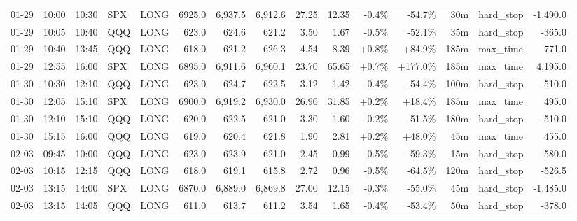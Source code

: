 \documentclass[11pt,a4paper,twoside]{article}
\begin{document}
\begin{landscape}
\begin{center}
\begin{longtable}{>{\color{txtmain}}l l l l l r r r r r r r r >{\color{txtmain}}l r}
01-29 & 10:00 & 10:30 & SPX & LONG & 6925.0 & 6,937.5 & 6,912.6 & 27.25 & 12.35 & \textcolor{lossred}{-0.4\%} & \textcolor{lossred}{-54.7\%} & 30m & hard\_stop & \textcolor{lossred}{-1,490.0} \\
01-29 & 10:05 & 10:40 & QQQ & LONG & 623.0 & 624.6 & 621.2 & 3.50 & 1.67 & \textcolor{lossred}{-0.5\%} & \textcolor{lossred}{-52.1\%} & 35m & hard\_stop & \textcolor{lossred}{-365.0} \\
01-29 & 10:40 & 13:45 & QQQ & LONG & 618.0 & 621.2 & 626.3 & 4.54 & 8.39 & \textcolor{wingreen}{+0.8\%} & \textcolor{wingreen}{+84.9\%} & 185m & max\_time & \textcolor{wingreen}{771.0} \\
01-29 & 12:55 & 16:00 & SPX & LONG & 6895.0 & 6,911.6 & 6,960.1 & 23.70 & 65.65 & \textcolor{wingreen}{+0.7\%} & \textcolor{wingreen}{+177.0\%} & 185m & max\_time & \textcolor{wingreen}{4,195.0} \\
01-30 & 10:30 & 12:10 & QQQ & LONG & 623.0 & 624.7 & 622.5 & 3.12 & 1.42 & \textcolor{lossred}{-0.4\%} & \textcolor{lossred}{-54.4\%} & 100m & hard\_stop & \textcolor{lossred}{-510.0} \\
01-30 & 12:05 & 15:10 & SPX & LONG & 6900.0 & 6,919.2 & 6,930.0 & 26.90 & 31.85 & \textcolor{wingreen}{+0.2\%} & \textcolor{wingreen}{+18.4\%} & 185m & max\_time & \textcolor{wingreen}{495.0} \\
01-30 & 12:10 & 15:10 & QQQ & LONG & 620.0 & 622.5 & 621.0 & 3.30 & 1.60 & \textcolor{lossred}{-0.2\%} & \textcolor{lossred}{-51.5\%} & 180m & hard\_stop & \textcolor{lossred}{-510.0} \\
01-30 & 15:15 & 16:00 & QQQ & LONG & 619.0 & 620.4 & 621.8 & 1.90 & 2.81 & \textcolor{wingreen}{+0.2\%} & \textcolor{wingreen}{+48.0\%} & 45m & max\_time & \textcolor{wingreen}{455.0} \\
02-03 & 09:45 & 10:00 & QQQ & LONG & 623.0 & 623.9 & 621.0 & 2.45 & 0.99 & \textcolor{lossred}{-0.5\%} & \textcolor{lossred}{-59.3\%} & 15m & hard\_stop & \textcolor{lossred}{-580.0} \\
02-03 & 10:15 & 12:15 & QQQ & LONG & 618.0 & 619.1 & 615.8 & 2.72 & 0.96 & \textcolor{lossred}{-0.5\%} & \textcolor{lossred}{-64.5\%} & 120m & hard\_stop & \textcolor{lossred}{-526.5} \\
02-03 & 13:15 & 14:00 & SPX & LONG & 6870.0 & 6,889.0 & 6,869.8 & 27.00 & 12.15 & \textcolor{lossred}{-0.3\%} & \textcolor{lossred}{-55.0\%} & 45m & hard\_stop & \textcolor{lossred}{-1,485.0} \\
02-03 & 13:15 & 14:05 & QQQ & LONG & 611.0 & 613.7 & 611.2 & 3.54 & 1.65 & \textcolor{lossred}{-0.4\%} & \textcolor{lossred}{-53.4\%} & 50m & hard\_stop & \textcolor{lossred}{-378.0} \\

\end{longtable}
\end{center}
\end{landscape}
\end{document}
